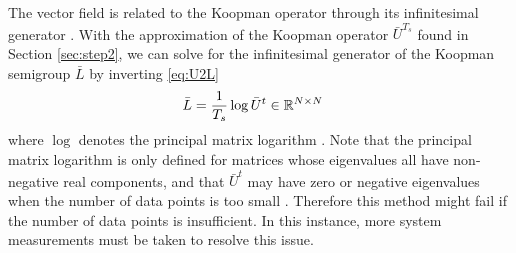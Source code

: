 The vector field is related to the Koopman operator through its infinitesimal generator .
With the approximation of the Koopman operator $\bar{U}^{T_s}$ found in Section \ref{sec:step2}, we can solve for the infinitesimal generator of the Koopman semigroup $\bar{L}$ by inverting \eqref{eq:U2L}
\begin{align}
    \bar{L} &= \frac{1}{T_s} \log{ \bar{U}^t } \in \mathbb{R}^{N \times N}
\end{align}
where $\log$ denotes the principal matrix logarithm \cite[]{higham2008functions}.
Note that the principal matrix logarithm is only defined for matrices whose eigenvalues all have non-negative real components, and that $\bar{U}^t$ may have zero or negative eigenvalues when the number of data points is too small \cite{mauroy2016linear}.
Therefore this method might fail if the number of data points is insufficient.
In this instance, more system measurements must be taken to resolve this issue.

